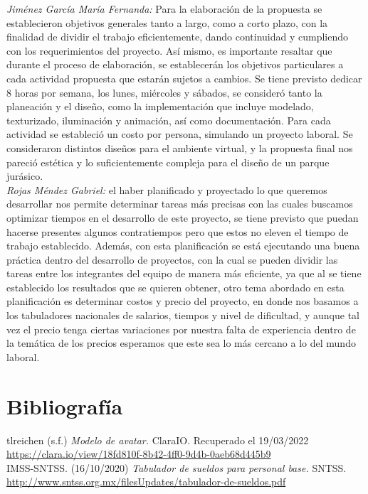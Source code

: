 \documentclass[12pt]{article} %
\begin{document}
	\emph{Jiménez García María Fernanda:}
	Para la elaboración de la propuesta se establecieron objetivos generales tanto a largo, como a corto plazo, con la 
	finalidad de dividir el trabajo eficientemente, dando continuidad y cumpliendo con los requerimientos del proyecto. 
	Así mismo, es importante resaltar que durante el proceso de elaboración, se establecerán los objetivos particulares a 
	cada actividad propuesta que estarán sujetos a cambios. Se tiene previsto dedicar 8 horas por semana,  los lunes, 
	miércoles y sábados, se consideró tanto la planeación y el diseño, como la implementación que incluye modelado, 
	texturizado, iluminación y animación, así como documentación. Para cada actividad se estableció un costo por persona, 
	simulando un proyecto laboral. Se consideraron distintos diseños para el ambiente virtual, y la propuesta final nos pareció 
	estética y lo suficientemente compleja para el diseño de un parque jurásico.
	\\
	
	\emph{Rojas Méndez Gabriel:}
	el haber planificado y proyectado lo que queremos desarrollar nos permite determinar tareas más precisas con las cuales 
	buscamos optimizar tiempos en el desarrollo de este proyecto, se tiene previsto que puedan hacerse presentes algunos 
	contratiempos pero que estos no eleven el tiempo de trabajo establecido. Además, con esta planificación se está ejecutando 
	una buena práctica dentro del desarrollo de proyectos, con la cual se pueden dividir las tareas entre los integrantes del 
	equipo de manera más eficiente, ya que al se tiene establecido los resultados que se quieren obtener, otro tema abordado en 
	esta planificación es determinar costos y precio del proyecto, en donde nos basamos a los tabuladores nacionales de salarios, 
	tiempos y nivel de dificultad, y aunque tal vez el precio tenga ciertas variaciones por nuestra falta de experiencia dentro 
	de la temática de los precios esperamos que este sea lo más cercano a lo del mundo laboral.
 	
	\section{Bibliografía}
	
	tlreichen (s.f.) \emph{Modelo de avatar.} ClaraIO. Recuperado el 19/03/2022
	\color{blue}\url{https://clara.io/view/18fd810f-8b42-4ff0-9d4b-0aeb68d445b9}\color{black}
	\\
	
	IMSS-SNTSS. (16/10/2020) \emph{Tabulador de sueldos para personal base.} SNTSS. 
	\color{blue}\url{http://www.sntss.org.mx/filesUpdates/tabulador-de-sueldos.pdf}\color{black}
	
\end{document}
